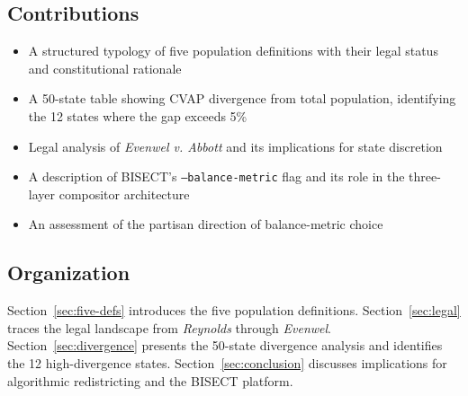 \subsection{Contributions}

\begin{itemize}
    \item A structured typology of five population definitions with their legal status and constitutional rationale
    \item A 50-state table showing CVAP divergence from total population, identifying the 12 states where the gap exceeds 5\%
    \item Legal analysis of \emph{Evenwel v. Abbott} and its implications for state discretion
    \item A description of BISECT's \texttt{--balance-metric} flag and its role in the three-layer compositor architecture
    \item An assessment of the partisan direction of balance-metric choice
\end{itemize}

\subsection{Organization}

Section~\ref{sec:five-defs} introduces the five population definitions. Section~\ref{sec:legal} traces the legal landscape from \emph{Reynolds} through \emph{Evenwel}. Section~\ref{sec:divergence} presents the 50-state divergence analysis and identifies the 12 high-divergence states. Section~\ref{sec:conclusion} discusses implications for algorithmic redistricting and the BISECT platform.
